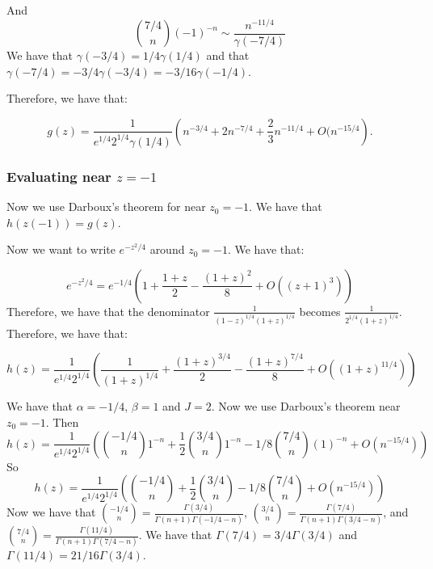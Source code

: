 \documentclass[]{article}
\begin{document}
And
\begin{equation}
	\binom{7/4}{n}(-1)^{-n} \sim \frac{n^{-11/4}}{\gamma(-7/4)}
\end{equation}
We have that $\gamma(-3/4) = 1/4 \gamma(1/4)$ and that $\gamma(-7/4) = -3/4 \gamma(-3/4) = -3/16 \gamma(-1/4)$. 

Therefore, we have that:

\begin{equation}
	[z^n]g(z) = \frac{1}{e^{1/4} 2^{1/4}\gamma(1/4)} \left( n^{-3/4} +  2 n^{-7/4} + \frac{2}{3} n^{-11/4} + O(n^{-15/4} \right).
\end{equation}

\subsubsection{Evaluating near $z = -1$}
Now we use Darboux's theorem for near $z_0 = -1$. We have that $h(z(-1)) = g(z)$. 

Now we want to write $e^{-z^2/4}$ around $z_0 = -1$. We have that:

\begin{equation}
	e^{-z^2/4} = e^{-1/4} \left(1 + \frac{1 + z}{2} - \frac{(1 + z)^2}{8} + O((z + 1)^3)\right)
\end{equation}
Therefore, we have that the denominator $\frac{1}{(1 - z)^{1/4} (1 + z)^{1/4}}$ becomes $\frac{1}{2^{1/4}(1 + z)^{1/4}}$. Therefore, we have that:

\begin{equation}
	h(z) = \frac{1}{e^{1/4} 2^{1/4}} \left(\frac{1}{(1 + z)^{1/4}} + \frac{(1 + z)^{3/4}}{2} - \frac{(1 + z)^{7/4}}{8} +  O((1 + z)^{11/4})\right)
\end{equation}

We have that $\alpha = -1/4$, $\beta = 1$ and $J = 2$. 
Now we use Darboux's theorem near $z_0 = -1$. Then 
\begin{equation}
	[z^n] h(z) = \frac{1}{e^{1/4} 2^{1/4}} \left(\binom{-1/4}{n} 1^{-n}+ \frac{1}{2} \binom{3/4}{n} 1^{-n} - 1/8 \binom{7/4}{n} (1)^{-n }+  O(n^{-15/4})\right)
\end{equation}
So 
\begin{equation}
	[z^n] h(z) = \frac{1}{e^{1/4} 2^{1/4}} \left(\binom{-1/4}{n} + \frac{1}{2} \binom{3/4}{n} - 1/8 \binom{7/4}{n}+  O(n^{-15/4})\right)
\end{equation}
Now we have that $\binom{-1/4}{n} = \frac{\Gamma(3/4)}{\Gamma(n + 1) \Gamma(-1/4 - n)}$, $\binom{3/4}{n} = \frac{\Gamma(7/4)}{\Gamma(n + 1) \Gamma(3/4 - n)}$, and $\binom{7/4}{n} = \frac{\Gamma(11/4)}{\Gamma(n + 1) \Gamma(7/4 - n)}$. We have that $\Gamma(7/4) = 3/4 \Gamma(3/4)$ and $\Gamma(11/4) = 21/16 \Gamma(3/4)$. 
\end{document}
